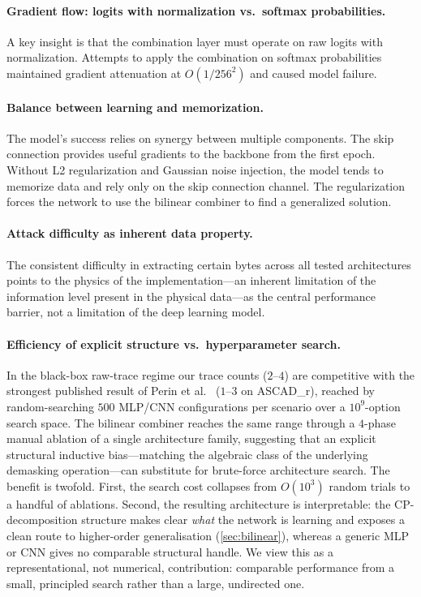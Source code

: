 \documentclass[runningheads]{llncs}
\begin{document}
\paragraph{Gradient flow: logits with normalization vs.\ softmax probabilities.}
A key insight is that the combination layer must operate on raw logits with normalization.
Attempts to apply the combination on softmax probabilities maintained gradient attenuation at $O(1/256^2)$ and caused model failure.

\paragraph{Balance between learning and memorization.}
The model's success relies on synergy between multiple components.
The skip connection provides useful gradients to the backbone from the first epoch.
Without L2 regularization and Gaussian noise injection, the model tends to memorize data and rely only on the skip connection channel.
The regularization forces the network to use the bilinear combiner to find a generalized solution.

\paragraph{Attack difficulty as inherent data property.}
The consistent difficulty in extracting certain bytes across all tested architectures points to the physics of the implementation---an inherent limitation of the information level present in the physical data---as the central performance barrier, not a limitation of the deep learning model.

\paragraph{Efficiency of explicit structure vs.\ hyperparameter search.}
In the black-box raw-trace regime our trace counts ($2$--$4$) are competitive with the strongest published result of Perin et al.~\cite{perin2022exploring} ($1$--$3$ on ASCAD\_r), reached by random-searching $500$ MLP/CNN configurations per scenario over a $10^{9}$-option search space.
The bilinear combiner reaches the same range through a $4$-phase manual ablation of a single architecture family, suggesting that an explicit structural inductive bias---matching the algebraic class of the underlying demasking operation---can substitute for brute-force architecture search.
The benefit is twofold.
First, the search cost collapses from $O(10^3)$ random trials to a handful of ablations.
Second, the resulting architecture is interpretable: the CP-decomposition structure makes clear \emph{what} the network is learning and exposes a clean route to higher-order generalisation (\cref{sec:bilinear}), whereas a generic MLP or CNN gives no comparable structural handle.
We view this as a representational, not numerical, contribution: comparable performance from a small, principled search rather than a large, undirected one.
\end{document}
